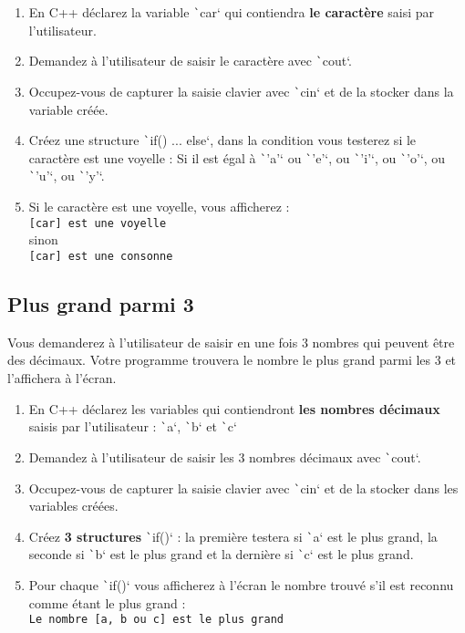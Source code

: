 \documentclass[10pt]{article}
\begin{document}
\begin{enumerate}
    \item En C++ déclarez la variable \texttt`car` qui contiendra \textbf{le caractère} saisi par l'utilisateur.
    \item Demandez à l'utilisateur de saisir le caractère avec \texttt`cout`. 
    \item Occupez-vous de capturer la saisie clavier avec \texttt`cin` et de la stocker dans la variable créée.
    \item Créez une structure \texttt`if() ... else`, dans la condition vous testerez si le caractère est une voyelle : Si il est égal à \texttt`'a'` ou \texttt`'e'`, ou \texttt`'i'`, ou \texttt`'o'`, ou \texttt`'u'`, ou \texttt`'y'`.
    \item Si le caractère est une voyelle, vous afficherez :\\
     \verb|[car] est une voyelle|\\
    sinon \\
    \verb|[car] est une consonne|
\end{enumerate}


\subsection{Plus grand parmi 3}
Vous demanderez à l'utilisateur de saisir en une fois 3 nombres qui peuvent être des décimaux. Votre programme
trouvera le nombre le plus grand parmi les 3 et l'affichera à l'écran.

\begin{enumerate}
    \item En C++ déclarez les variables qui contiendront \textbf{les nombres décimaux} saisis par l'utilisateur : \texttt`a`, \texttt`b` et \texttt`c`  
    \item Demandez à l'utilisateur de saisir les 3 nombres décimaux avec \texttt`cout`. 
    \item Occupez-vous de capturer la saisie clavier avec \texttt`cin` et de la stocker dans les variables créées.
    \item Créez \textbf{3 structures} \texttt`if()` : la première testera si \texttt`a` est le plus grand, la seconde si \texttt`b` est le plus grand et la dernière si \texttt`c` est le plus grand.
    \item Pour chaque \texttt`if()` vous afficherez à l'écran le nombre trouvé s'il est reconnu comme étant le plus grand :\\
    \verb|Le nombre [a, b ou c] est le plus grand|
\end{enumerate}
\end{document}
